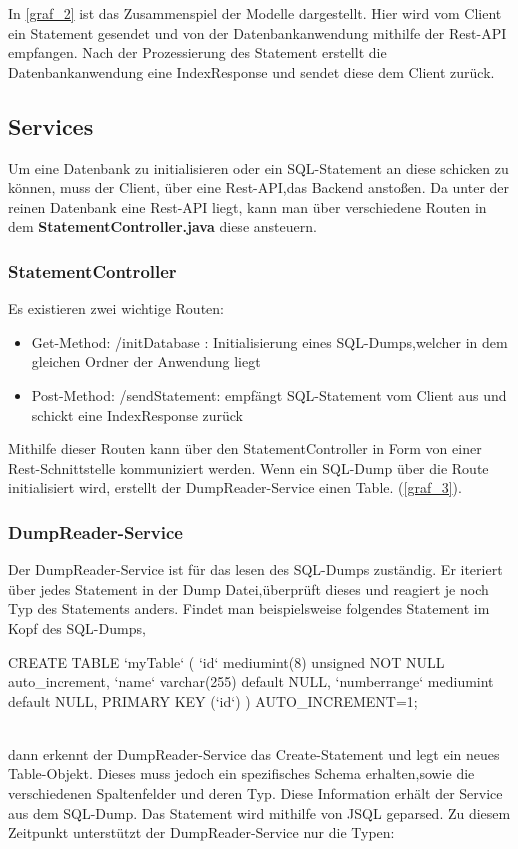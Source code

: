 In \ref{graf_2} ist das Zusammenspiel der Modelle dargestellt. Hier wird vom Client ein Statement gesendet und von der Datenbankanwendung mithilfe der Rest-API empfangen. Nach der Prozessierung des Statement erstellt die Datenbankanwendung eine IndexResponse und sendet diese dem Client zurück.





\subsection{Services}
Um eine Datenbank zu initialisieren oder ein SQL-Statement an diese schicken zu können, muss der Client, über eine Rest-API,das Backend anstoßen.
Da unter der reinen Datenbank eine Rest-API liegt, kann man über verschiedene Routen in dem \textbf{StatementController.java} diese ansteuern.


\subsubsection{StatementController}
Es existieren zwei wichtige Routen:

\begin{itemize}
 \item Get-Method: /initDatabase : Initialisierung eines SQL-Dumps,welcher in dem gleichen Ordner der Anwendung liegt
 \item Post-Method: /sendStatement: empfängt SQL-Statement vom Client aus und schickt eine IndexResponse zurück
\end{itemize}

Mithilfe dieser Routen kann über den StatementController in Form von einer Rest-Schnittstelle kommuniziert werden.
Wenn ein SQL-Dump über die Route initialisiert wird, erstellt der DumpReader-Service einen Table. (\ref{graf_3}). 


\subsubsection{DumpReader-Service}
Der DumpReader-Service ist für das lesen des SQL-Dumps zuständig. Er iteriert über jedes Statement in der Dump Datei,überprüft dieses und reagiert je noch Typ des Statements anders.
Findet man beispielsweise folgendes Statement im Kopf des SQL-Dumps,
\\

\begin{terminalblock}
  \begin{textcode}
CREATE TABLE `myTable` (
  `id` mediumint(8) unsigned NOT NULL auto_increment,
  `name` varchar(255) default NULL,
  `numberrange` mediumint default NULL,
  PRIMARY KEY (`id`)
) AUTO_INCREMENT=1;
  \end{textcode}
\end{terminalblock}\\
dann erkennt der DumpReader-Service das Create-Statement und legt ein neues Table-Objekt. Dieses muss jedoch ein spezifisches Schema erhalten,sowie die verschiedenen Spaltenfelder und deren Typ.
Diese Information erhält der Service aus dem SQL-Dump.
Das Statement wird mithilfe von JSQL geparsed.
Zu diesem Zeitpunkt unterstützt der DumpReader-Service nur die Typen:


